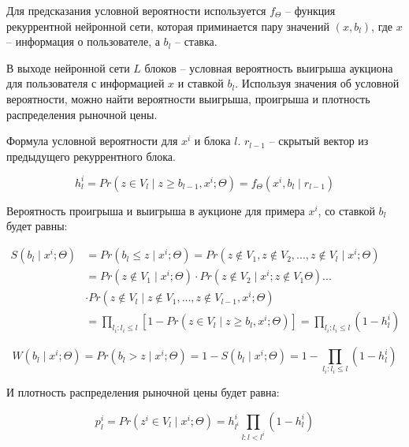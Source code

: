 \documentclass[times,specification,annotation]{itmo-student-thesis}
\begin{document}
Для предсказания условной вероятности используется 
$f_{\Theta}$ – функция рекуррентной нейронной сети, 
которая приминается пару значений $(x, b_l)$, 
где $x$ – информация о пользователе, а $b_l$ – ставка.

В выходе нейронной сети $L$ блоков – условная вероятность выигрыша аукциона для пользователя с информацией $x$ и ставкой $b_l$. 
Используя значения об условной вероятности, можно найти вероятности выигрыша, проигрыша и плотность распределения рыночной цены.

Формула условной вероятности для $x^i$ и блока $l$. $r_{l-1}$ – скрытый вектор из предыдущего рекуррентного блока.

\begin{equation}
    h_l^i = Pr⁡(z \in V_l \mid z \geq b_{l-1}, x^i; \Theta)= f_{\Theta} (x^i,b_l \mid r_{l-1})
\end{equation}

Вероятность проигрыша и выигрыша в аукционе для примера $x^i$, со ставкой $b_l$ будет равны:

\begin{equation}\label{eq:nnS}
    \begin{split}
        S(b_l \mid x^i; \Theta) & = Pr(b_l \leq z \mid x^i; \Theta) = Pr(z \notin V_1, z \notin V_2, ..., z \notin V_l \mid x^i; \Theta) \\
        & = Pr(z \notin V_1 \mid x^i; \Theta) \cdot Pr(z \notin V_2 \mid x^i; z \notin V_1 \Theta) ... \\
        & \cdot Pr(z \notin V_l \mid z \notin V_1, ..., z \notin V_{l - 1},  x^i; \Theta) \\
        & = \prod_{l_i : l_i \leq l} \left[1 - Pr(z \in V_l \mid z \geq b_l, x^i; \Theta)\right] = \prod_{l_i: l_i \leq l} (1 - h_l^i)
    \end{split}
\end{equation}

\begin{equation}\label{eq:nnW}
    W(b_l \mid x^i; \Theta) = Pr(b_l > z \mid x^i; \Theta) = 1 - S(b_l \mid x^i; \Theta) = 1 - \prod_{l_i: l_i \leq l} (1 - h_l^i)
\end{equation}

И плотность распределения рыночной цены будет равна:

\begin{equation}\label{eq:nnP}
    p_l^i = Pr(z^i \in V_l \mid x^i; \Theta) = h_{l^i}^i \prod_{l: l < l^i} (1 - h_l^i)
\end{equation}
\end{document}
